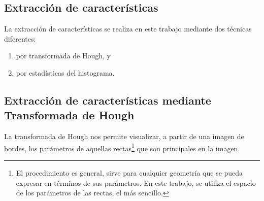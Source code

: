 \documentclass[conference,spanish,a4paper,10pt,oneside,final]{tfmpd}
\begin{document}
\subsection*{Extracción de características}

La extracción de características se realiza en este trabajo mediante dos
técnicas diferentes:
\begin{enumerate}
\item %
por transformada de Hough, y
\item %
por estadísticas del histograma.
\end{enumerate}

%

%
%
\subsection*{Extracción de características mediante Transformada de Hough}
La transformada de Hough nos permite visualizar, a partir de una imagen de
bordes, los parámetros de aquellas rectas\footnote{El procedimiento es general,
sirve para cualquier geometría que se pueda expresar en términos de sus
parámetros. En este trabajo, se utiliza %
el espacio de los parámetros de las
rectas, el más sencillo.}
que son principales en la imagen.
\end{document}
